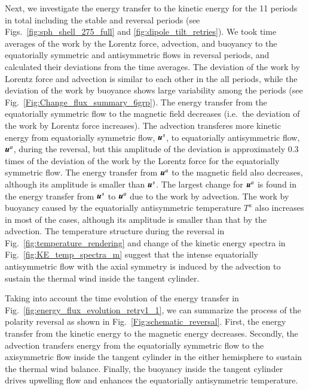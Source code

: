 Next, we investigate the energy transfer to the kinetic energy for the 11 periods in total including the stable and reversal periods (see Figs.\ \ref{fig:sph_shell_275_full} and \ref{fig:dipole_tilt_retries}).
We took time averages of the work by the Lorentz force, advection, and buoyancy to the equatorially symmetric and antisymmetric flows in reversal periods, and calculated their deviations from the time averages.
The deviation of the work by Lorentz force and advection is similar to each other in the all periods, while the deviation of the work by buoyance shows large variability among the periods (see Fig.~\ref{Fig:Change_flux_summary_6grp}).
The energy transfer from the equatorially symmetric flow to the magnetic field decreases (i.e.\ the deviation of the work by Lorentz force increases). 
{\color {blue} 
The advection transferes more kinetic energy from equatorially symmetric flow, $\mbox{\boldmath$u$}^s$, to equatorially antisymmetric flow, $\mbox{\boldmath$u$}^a$, during the reversal, but this amplitude of the deviation is approximately 0.3 times of the deviation of the work by the Lorentz force for the equatorially symmetric flow.
}
{\color{magenta}
The energy transfer from $\mbox{\boldmath$u$}^a$ to the magnetic field also decreases, although its amplitude is smaller than $\mbox{\boldmath$u$}^s$.
}
The largest change for $\mbox{\boldmath$u$}^a$ is found in the energy transfer from $\mbox{\boldmath$u$}^s$ to $\mbox{\boldmath$u$}^a$ due to the work by advection. 
The work by buoyancy caused by the equatorially antisymmetric temperature $T^{a}$ also increases in most of the cases, although its amplitude is smaller than that by the advection. 
The temperature structure during the reversal in Fig.~\ref{fig:temperature_rendering} and change of the kinetic energy spectra in Fig.~\ref{fig:KE_temp_spectra_m} suggest that the intense equatorially antisymmetric flow with the axial symmetry is induced by the advection to sustain the thermal wind inside the tangent cylinder. 

Taking into account the time evolution of the energy transfer in Fig.~\ref{fig:energy_flux_evolution_retry1_1}, we can summarize the process of the polarity reversal as shown in Fig.~\ref{Fig:schematic_reversal}. 
First, the energy transfer 
{\color{teal}
from the kinetic energy
}
to the magnetic energy decreases. 
Secondly, the advection transfers energy from the equatorially symmetric flow to the axisymmetric flow inside the tangent cylinder in the either hemisphere to sustain the thermal wind balance. 
Finally, the buoyancy inside the tangent cylinder drives upwelling flow and enhances the equatorially antisymmetric temperature.


